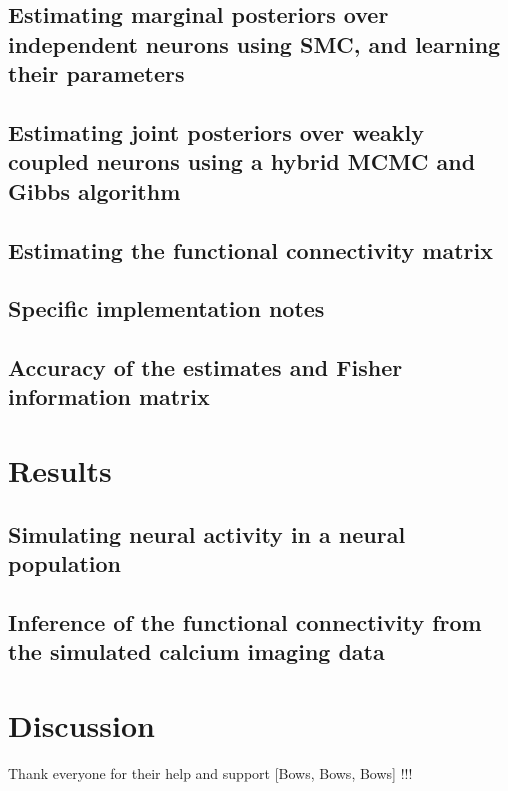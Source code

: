 \documentclass[amsmath, amssymb]{revtex4}
\begin{document}
\subsection{Estimating marginal posteriors over independent neurons using SMC, and learning their parameters}
\label{sec:methods:indep}


\subsection{Estimating joint posteriors over weakly coupled neurons using a hybrid MCMC and Gibbs algorithm}
\label{sec:methods:sampling HMM}


\subsection{Estimating the functional connectivity matrix} %
\label{sec:methods:parameters HMM}


\subsection{Specific implementation notes}
\label{sec:methods:specific_implementation}


\subsection{Accuracy of the estimates and Fisher information matrix}
\label{sec:methods:accuracy_Fisher}


\section{Results}
\label{results}

\subsection{Simulating neural activity in a neural population}
\label{sec:results:simulations}


\subsection{Inference of the functional connectivity from the simulated calcium imaging data}
\label{sec:results:inference}


\section{Discussion}
\label{discussion}


\begin{acknowledgments}
Thank everyone for their help and support [Bows, Bows, Bows] !!!
\end{acknowledgments}



\end{document}
